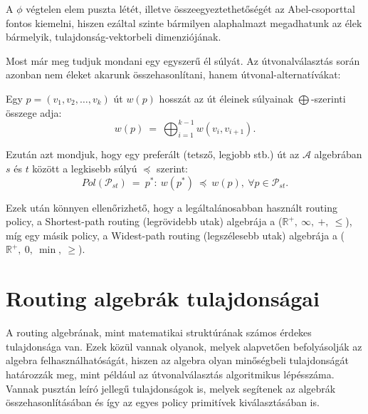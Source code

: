 
  \begin{note}
    A $\phi$ végtelen elem puszta létét, illetve összeegyeztethetőségét az Abel-csoporttal fontos kiemelni, hiszen ezáltal szinte bármilyen alaphalmazt megadhatunk az élek bármelyik, tulajdonság-vektorbeli dimenziójának.%
  \end{note}

  Most már meg tudjuk mondani egy egyszerű él súlyát. Az útvonalválasztás során azonban nem éleket akarunk összehasonlítani, hanem útvonal-alternatívákat:

  \begin{definition} 
    Egy $p=(v_{1}, v_{2},\ldots, v_{k})$ út $w(p)$ hosszát az út éleinek súlyainak $\bigoplus$-szerinti összege adja: $$w(p)~=~\bigoplus_{i=1}^{k-1}w(v_{i}, v_{i+1}).$$
  \end{definition}

  Ezután azt mondjuk, hogy egy preferált (tetsző, legjobb stb.) út az $\mathcal{A}$ algebrában $s$ és $t$ között a legkisebb súlyú $\preceq$ szerint: $$Pol(\mathcal{P}_{st})~=~p^{*}:~w(p^{*})~\preceq~w(p),~\forall p \in \mathcal{P}_{st}.$$

  Ezek után könnyen ellenőrizhető, hogy a legáltalánosabban használt routing policy, a Shortest-path routing (legrövidebb utak) algebrája a ($\mathbb{R}^{+},~\infty,~+,~\leq$), míg egy másik policy, a Widest-path routing (legszélesebb utak) algebrája a ($\mathbb{R}^{+},~0,~\min,~\geq$).

  \section{Routing algebrák tulajdonságai}\label{section_algebratulajdonsagok}
  A routing algebrának, mint matematikai struktúrának számos érdekes tulajdonsága van. Ezek közül vannak olyanok, melyek alapvetően befolyásolják az algebra felhasználhatóságát, hiszen az algebra olyan minőségbeli tulajdonságát határozzák meg, mint például az útvonalválasztás algoritmikus lépésszáma. Vannak pusztán leíró jellegű tulajdonságok is, melyek segítenek az algebrák összehasonlításában és így az egyes policy primitívek kiválasztásában is.

